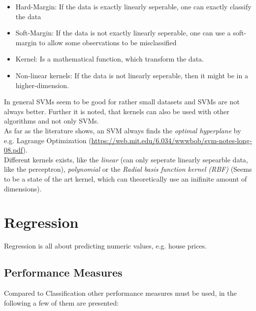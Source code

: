 \documentclass[12pt,a4paper]{article}
\begin{document}
\begin{itemize}
    \item Hard-Margin: If the data is exactly linearly seperable, one can exactly classify the data
    \item Soft-Margin: If the data is not exactly linearly seperable, one can use a soft-margin to allow some observations to be misclassified
    \item Kernel: Is a mathematical function, which transform the data.
    \item Non-linear kernels: If the data is not linearly seperable, then it might be in a higher-dimension.
\end{itemize}

\noindent In general SVMs seem to be good for rather small datasets and SVMs are not always better. Further it is noted, that kernels can also be used with other algorithms and not only SVMs.\\
As far as the literature shows, an SVM always finds the \textit{optimal hyperplane} by e.g. Lagrange Optimization (\url{https://web.mit.edu/6.034/wwwbob/svm-notes-long-08.pdf}).\\[1em]
Different kernels exists, like the \textit{linear} (can only seperate linearly sepearble data, like the perceptron), \textit{polynomial} or the \textit{Radial basis function kernel (RBF)} (Seems to be a state of the art kernel, which can theoretically use an inifinite amount of dimensions).


\newpage
\section{Regression}

\noindent Regression is all about predicting numeric values, e.g. house prices.\\

\subsection{Performance Measures}

\noindent Compared to Classification other performance measures must be used, in the following a few of them are presented:
\end{document}
